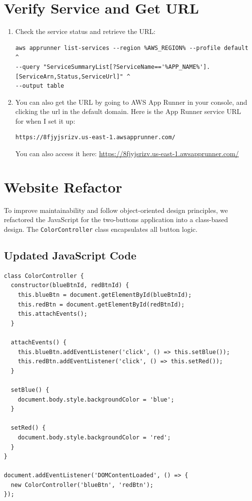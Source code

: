 \section{Verify Service and Get URL}
\begin{enumerate}
  \item Check the service status and retrieve the URL:
\begin{verbatim}
aws apprunner list-services --region %AWS_REGION% --profile default ^
--query "ServiceSummaryList[?ServiceName=='%APP_NAME%'].[ServiceArn,Status,ServiceUrl]" ^
--output table
\end{verbatim}

\item You can also get the URL by going to AWS App Runner in your console, and clicking the url in the default domain. Here is the App Runner service URL for when I set it up:

\begin{verbatim}
https://8fjyjsrizv.us-east-1.awsapprunner.com/
\end{verbatim}

\noindent
You can also access it here: \href{https://8fjyjsrizv.us-east-1.awsapprunner.com/}{https://8fjyjsrizv.us-east-1.awsapprunner.com/}

\end{enumerate}

\section{Website Refactor}

To improve maintainability and follow object-oriented design principles, 
we refactored the JavaScript for the two-buttons application into a class-based design.
The \texttt{ColorController} class encapsulates all button logic.

\subsection{Updated JavaScript Code}

\begin{verbatim}
class ColorController {
  constructor(blueBtnId, redBtnId) {
    this.blueBtn = document.getElementById(blueBtnId);
    this.redBtn = document.getElementById(redBtnId);
    this.attachEvents();
  }

  attachEvents() {
    this.blueBtn.addEventListener('click', () => this.setBlue());
    this.redBtn.addEventListener('click', () => this.setRed());
  }

  setBlue() {
    document.body.style.backgroundColor = 'blue';
  }

  setRed() {
    document.body.style.backgroundColor = 'red';
  }
}

document.addEventListener('DOMContentLoaded', () => {
  new ColorController('blueBtn', 'redBtn');
});
\end{verbatim}

